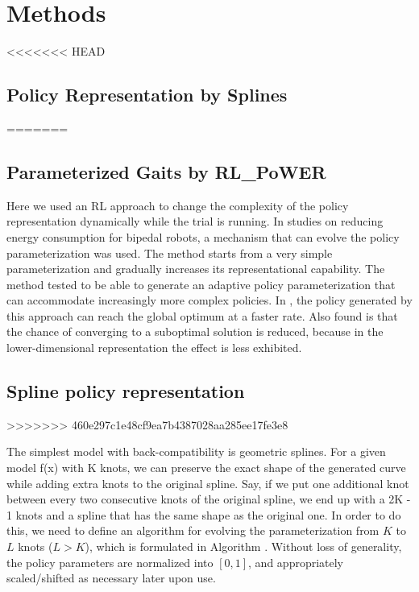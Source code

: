 \section{Methods}


<<<<<<< HEAD
\subsection{Policy Representation by Splines}
=======

\subsection{Parameterized Gaits by RL\_PoWER}

Here we used an RL approach to change the complexity of the policy
representation dynamically while the trial is running. In
\cite{kormushev2011bipedal-walking-energy} studies on reducing energy
consumption for bipedal robots, a mechanism that can
evolve the policy parameterization was used. The method starts from a
very simple parameterization and gradually increases its
representational capability. The method tested to be able to generate
an adaptive policy parameterization that can accommodate increasingly
more complex policies. In \cite{kormushev2011bipedal-walking-energy}, the policy
generated by this approach can reach the global optimum at a faster
rate. Also found is that the chance of converging to a suboptimal
solution is reduced, because in the lower-dimensional representation
the effect is less exhibited.



\subsection{Spline policy representation}
>>>>>>> 460e297c1e48cf9ea7b4387028aa285ee17fe3e8

The simplest model with back-compatibility is geometric
splines. For a given model f(x) with K knots, we can preserve the
exact shape of the generated curve while adding extra knots to the
original spline. Say, if we put one additional knot between every two
consecutive knots of the original spline, we end up with a 2K - 1
knots and a spline that has the same shape as the original one. In
order to do this, we need to define an algorithm for evolving the
parameterization from $K$ to $L$ knots ($L > K$), which is formulated in
Algorithm .  Without loss of generality, the policy parameters are
normalized into $[0, 1]$, and appropriately scaled/shifted as necessary
later upon use.

